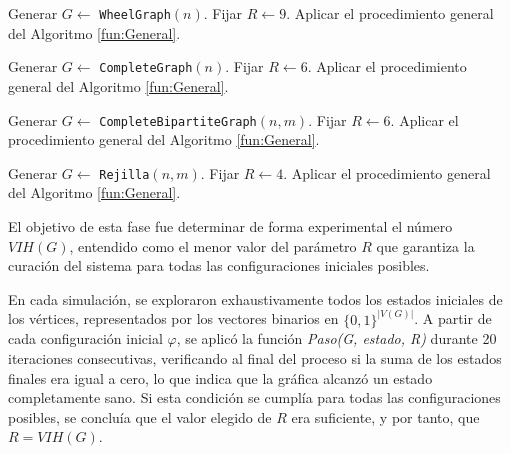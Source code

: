 \documentclass[12pt,titlepage,twoside,openright]{book}
\begin{document}
\begin{algorithm}[H]
\caption{C\'alculo de $VIH(W_n)$}
\label{fun:VIH(Wn)}
\begin{algorithmic}[1]
    \State Generar $G \gets$ \texttt{WheelGraph}$(n)$.
    \State Fijar $R \gets 9$.
    \State Aplicar el procedimiento general del Algoritmo \ref{fun:General}.
\EndFor
\end{algorithmic}
\end{algorithm}
\begin{algorithm}[H]
\caption{C\'alculo de $VIH(K_n)$}
\label{fun:VIH(Kn)}
\begin{algorithmic}[1]
    \State Generar $G \gets$ \texttt{CompleteGraph}$(n)$.
    \State Fijar $R \gets 6$.
    \State Aplicar el procedimiento general del Algoritmo \ref{fun:General}.
\EndFor
\end{algorithmic}
\end{algorithm}
\begin{algorithm}[H]
\caption{C\'alculo de $VIH(K_{n,m})$}
\label{fun:VIH(Kn,m)}
\begin{algorithmic}[1]
            \State Generar $G \gets$ \texttt{CompleteBipartiteGraph}$(n,m)$.
            \State Fijar $R \gets 6$.
            \State Aplicar el procedimiento general del Algoritmo \ref{fun:General}.
        \EndIf
    \EndFor
\EndFor
\end{algorithmic}
\end{algorithm}
\newpage
\begin{algorithm}[H]
\caption{C\'alculo de $VIH(R_{n,m})$}
\label{fun:VIH(Rn,m)}
\begin{algorithmic}[1]
            \State Generar $G \gets$ \texttt{Rejilla}$(n,m)$.
            \State Fijar $R \gets 4$.
            \State Aplicar el procedimiento general del Algoritmo \ref{fun:General}.
        \EndIf
    \EndFor
\EndFor
\end{algorithmic}
\end{algorithm}
El objetivo de esta fase fue determinar de forma experimental el n\'umero $VIH(G)$, entendido como el menor valor del par\'ametro $R$ que garantiza la curaci\'on del sistema para todas las configuraciones iniciales posibles.

En cada simulaci\'on, se exploraron exhaustivamente todos los estados iniciales de los v\'ertices, representados por los vectores binarios en $\{0,1\}^{|V(G)|}$. A partir de cada configuraci\'on inicial $\varphi$, se aplic\'o la funci\'on \textit{Paso(G, estado, R)} durante 20 iteraciones consecutivas, verificando al final del proceso si la suma de los estados finales era igual a cero, lo que indica que la gr\'afica alcanz\'o un estado completamente sano. Si esta condici\'on se cumpl\'ia para todas las configuraciones posibles, se conclu\'ia que el valor elegido de $R$ era suficiente, y por tanto, que $R = VIH(G)$.
\end{document}
